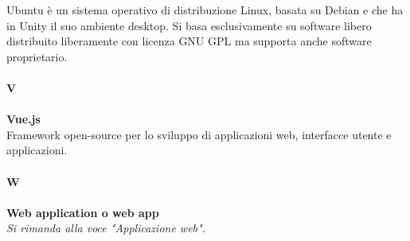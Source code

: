 Ubuntu è un sistema operativo di distribuzione Linux, basata su Debian e che ha in Unity il suo ambiente desktop. Si basa esclusivamente su software libero distribuito liberamente con licenza GNU GPL ma supporta anche software proprietario. \\
\\
\textbf{V}\\
\\
\textbf{Vue.js}\\
 Framework open-source per lo sviluppo di applicazioni web, interfacce utente e applicazioni. \\
\\
\textbf{W} \\
\\
\textbf{Web application o web app}\\
\textit{Si rimanda alla voce "Applicazione web".}